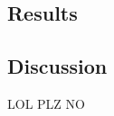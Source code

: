 \subsection{Results}

%            
%            
%            
%            
%            
%            

%            
%            
%            
%            
%            
%            
%
%            
%            
%            

\subsection{Discussion}

LOL PLZ NO
